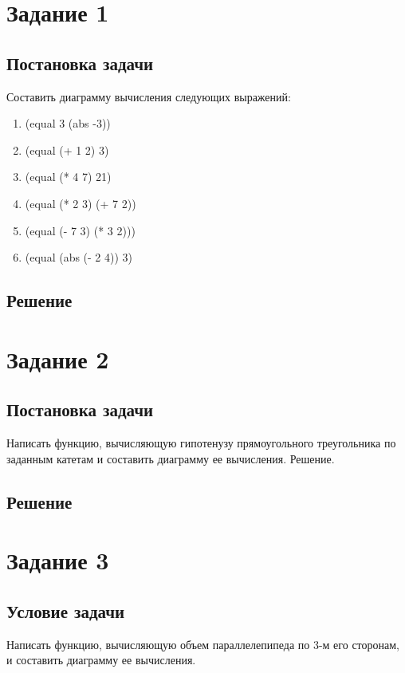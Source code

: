 \section*{Задание 1}
\subsection*{Постановка задачи}

Составить диаграмму вычисления следующих выражений:

\begin{enumerate}
	\item (equal 3 (abs -3))
	\item (equal (+ 1 2) 3)
	\item (equal (* 4 7) 21)
	\item (equal (* 2 3) (+ 7 2))
	\item (equal (- 7 3) (* 3 2)))
	\item (equal (abs (- 2 4)) 3)
\end{enumerate}

\subsection*{Решение}


\section*{Задание 2}
\subsection*{Постановка задачи}

Написать функцию, вычисляющую гипотенузу прямоугольного треугольника по заданным катетам и составить диаграмму ее вычисления. Решение.

\subsection*{Решение}



\section*{Задание 3}
\subsection*{Условие задачи}
Написать функцию, вычисляющую объем параллелепипеда по 3-м его сторонам, и составить диаграмму ее вычисления.

